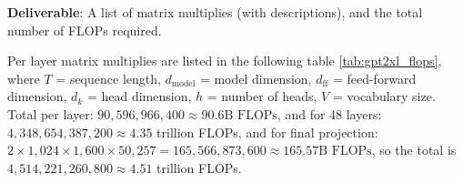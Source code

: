 \begin{enumerate}[label=(\alph*)]
    \textbf{Deliverable}: A list of matrix multiplies (with descriptions), and the total number of FLOPs required.
    
    \begin{answer}
    Per layer matrix multiplies are listed in the following table \ref{tab:gpt2xl_flops}, where $T$ = sequence length, $d_{\text{model}}$ = model dimension, $d_{\text{ff}}$ = feed-forward dimension, $d_k$ = head dimension, $h$ = number of heads, $V$ = vocabulary size.
    Total per layer: $90,596,966,400 \approx 90.6\text{B FLOPs}$, and for 48 layers: $4,348,654,387,200 \approx 4.35$ trillion FLOPs, and for final projection: $2 \times 1,024 \times 1,600 \times 50,257 = 165,566,873,600 \approx 165.57\text{B FLOPs}$, so the total is $4,514,221,260,800 \approx 4.51$ trillion FLOPs.
    \end{answer}


\end{enumerate}
